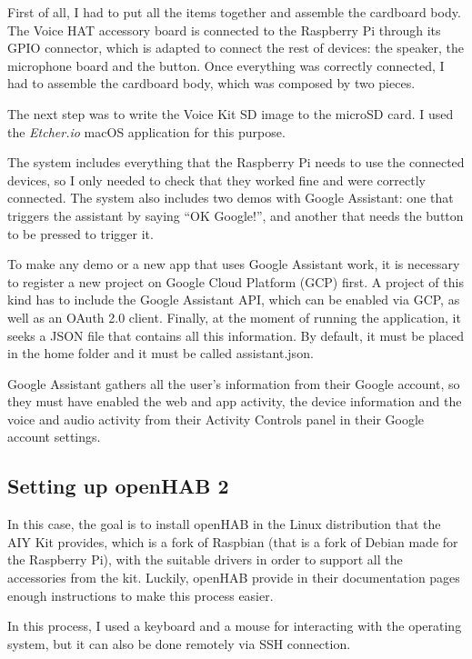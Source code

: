 First of all, I had to put all the items together and assemble the cardboard body. The Voice HAT accessory board is connected to the 
Raspberry Pi through its GPIO connector, which is adapted to connect the rest of devices: the speaker, the microphone board and the
button. Once everything was correctly connected, I had to assemble the cardboard body, which was composed by two 
pieces.\cite{aiyProjectsVoice}

The next step was to write the Voice Kit SD image\cite{voiceKitSdImage} to the microSD card. I used the \textit{Etcher.io} macOS 
application for this purpose. 

The system includes everything that the Raspberry Pi needs to use the connected devices, so I only needed to check that they worked 
fine and were correctly connected. The system also includes two demos with Google Assistant: one that triggers the assistant by saying 
“OK Google!”, and another that needs the button to be pressed to trigger it.

To make any demo or a new app that uses Google Assistant work, it is necessary to register a new project on Google Cloud Platform 
(GCP) first. A project of this kind has to include the Google Assistant API, which can be enabled via GCP, as well as an OAuth 2.0 
client. Finally, at the moment of running the application, it seeks a JSON file that contains all this information. By default, it 
must be placed in the home folder and it must be called assistant.json.

Google Assistant gathers all the user’s information from their Google account, so they must have enabled the web and app activity, 
the device information and the voice and audio activity from their Activity Controls panel in their Google account settings.

\subsection{Setting up openHAB 2}
In this case, the goal is to install openHAB in the Linux distribution that the AIY Kit provides, which is a fork of Raspbian 
(that is a fork of Debian made for the Raspberry Pi), with the suitable drivers in order to support all the accessories from the kit. 
Luckily, openHAB provide in their documentation pages\cite{openHABDocs} enough instructions to make this process easier.

In this process, I used a keyboard and a mouse for interacting with the operating system, but it can also be done remotely via 
SSH connection.

